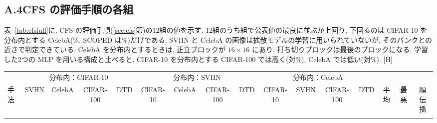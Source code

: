 \documentclass[MIRU,submit]{miru2025j}
\makeatletter
\newcommand{\method}{BURST}               %
\renewenvironment{table}{\@floatenv\capwidth\columnwidth\ecapwidth\columnwidth\abovecaptionskip\z@\belowcaptionskip1mm\@float{table}}{\end@float}
\makeatother
\begin{document}
\subsection*{A.4\quad CFS の評価手順の各組}
\label{sec:supp-cfs}
表~\ref{tab:cfsfull}に, CFS の評価手順(\ref{sec:cfs}節)の12組の値を示す. 12組のうち\nCfsNWin{}組で公表値の最良に並ぶか上回り, 下回るのは CIFAR-10 を分布内とする CelebA(\nCfsCCel\%. SCOPED は\nCfsCCelPub\%)だけである. SVHN と CelebA の画像は拡散モデルの学習に用いられていないが, そのバンクとの近さで判定できている. CelebA を分布内とするときは, 正立ブロックが $16{\times}16$ にあり, 打ち切りブロックは最後のブロックになる. 学習した2つの MLP を用いる構成と比べると, CIFAR-10 を分布内とする CIFAR-100 では高く(\nCfsCHund{}対\nCfsCHundTrained\%), CelebA では低い(\nCfsCCel{}対\nCfsCCelTrained\%).
\begin{table}[H]\centering\scriptsize\setlength{\tabcolsep}{2.5pt}
\caption{CFS の評価手順の各組(AUROC, \%). CIFAR-10 で学習した1つの拡散モデルを3つの分布内に用いる12組. 上の7行は文献の公表値 [MSMA から CFS までは文献~\cite{rouzoumka2026cfs}の値. SCOPED は文献~\cite{barkley2026scoped}の値で, モデルは CelebA で学習した DDPM(DTD の値はなく, $*$ は9組の平均)], 下の2行は本研究の実行(ノイズの種3つの平均)であり, 参考の行は, 比の代わりに学習した2つの MLP を用いる構成である. 最悪：分布内ごとに最も低い組をとった3つの平均. 順伝播：1枚あたりの回数(SCOPED の+はヤコビアンとベクトルの積). $\dagger$：公表値の中の最良. \protect\colorbox{firstblue}{\textbf{水色の太字}}：\method{} がそれに並ぶか上回る列. $\ddagger$：打ち切りまでの計算時間を1回の順伝播の時間で割った値(3つの分布内の平均. CelebA では1とした).}
\label{tab:cfsfull}
\begin{adjustbox}{max width=\textwidth}\begin{tabular}{@{}lccccccccccccccc@{}}\toprule
& \multicolumn{4}{c}{分布内：CIFAR-10} & \multicolumn{4}{c}{分布内：SVHN} & \multicolumn{4}{c}{分布内：CelebA} & & & \\\cmidrule(lr){2-5}\cmidrule(lr){6-9}\cmidrule(lr){10-13}
手法 & SVHN & CelebA & CIFAR-100 & DTD & CIFAR-10 & CelebA & CIFAR-100 & DTD & CIFAR-10 & SVHN & CIFAR-100 & DTD & 平均 & 最悪 & 順伝播\\\midrule
{}{tab_cfs.tex}
\end{tabular}\end{adjustbox}
\end{table}
\end{document}
